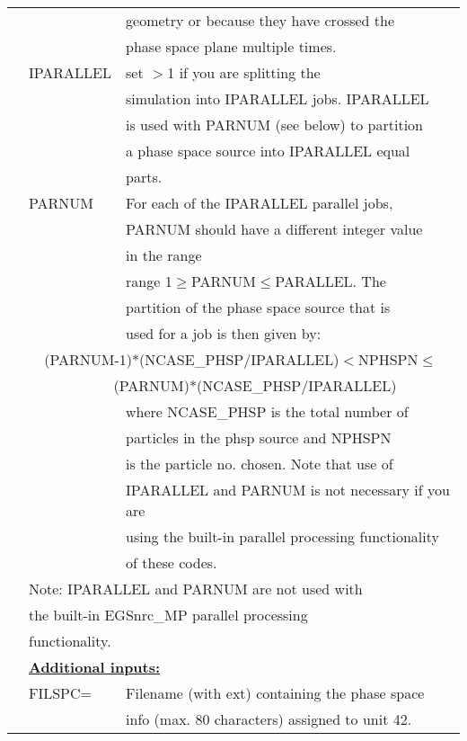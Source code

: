 \begin{longtable}{lll}
  &         & geometry or because they have crossed the\\
  &         & phase space plane multiple times.\\
  & IPARALLEL & set $>$1 if you are splitting the\\
  &         & simulation into IPARALLEL jobs.  IPARALLEL\\
  &         & is used with PARNUM (see below) to partition\\
  &         & a phase space source into IPARALLEL equal\\
  &         & parts.\\
  & PARNUM  & For each of the IPARALLEL parallel jobs,\\
  &         & PARNUM should have a different integer value\\
  &         & in the range\\
  &         & range 1$\geq$PARNUM$\leq$PARALLEL.  The\\
  &         & partition of the phase space source that is\\
  &         & used for a job is then given by:\\
  & \multicolumn{2}{c}{(PARNUM-1)*(NCASE\_PHSP/IPARALLEL)$<$NPHSPN$\leq$}\\
  & \multicolumn{2}{c}{~~~~(PARNUM)*(NCASE\_PHSP/IPARALLEL)}\\
  &         &  where NCASE\_PHSP is the total number of\\
  &         & particles in the phsp source and NPHSPN\\
  &         & is the particle no. chosen.  Note that use of\\
  &         & IPARALLEL and PARNUM is not necessary if you are\\
  &         & using the built-in parallel processing functionality\\
  &         & of these codes.\\
  & \multicolumn{2}{l}{Note: IPARALLEL and PARNUM are not used with}\\
  & \multicolumn{2}{l}{the built-in EGSnrc\_MP parallel processing}\\
  & \multicolumn{2}{l}{functionality.}\\
  & \multicolumn{2}{l}{\bf \underline {Additional inputs:}}\\
  & FILSPC=  & Filename (with ext) containing the phase space\\
  &         & info (max. 80 characters) assigned  to unit 42.\\

\end{longtable}
